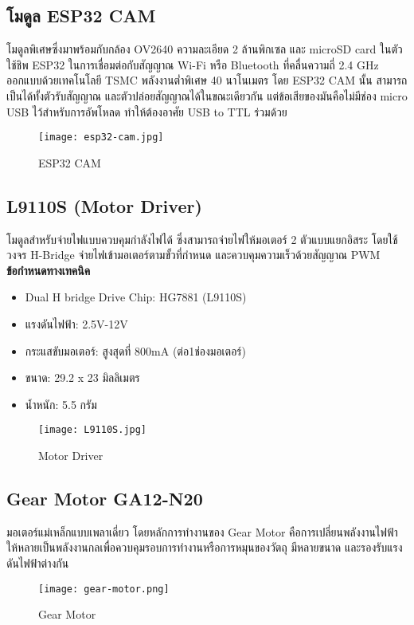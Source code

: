 \newpage\subsection{โมดูล ESP32 CAM}
โมดูลพิเศษซึ่งมาพร้อมกับกล้อง OV2640 ความละเอียด 2 ล้านพิกเซล และ microSD card ในตัว ใช้ชิพ ESP32 ในการเชื่อมต่อกับสัญญาณ Wi-Fi หรือ Bluetooth ที่คลื่นความถี่ 2.4 GHz
ออกแบบด้วยเทคโนโลยี TSMC พลังงานต่ำพิเศษ 40 นาโนเมตร โดย ESP32 CAM นั้น สามารถเป็นได้ทั้งตัวรับสัญญาณ และตัวปล่อยสัญญาณได้ในขณะเดียวกัน แต่ข้อเสียของมันคือไม่มีช่อง micro USB
ไว้สำหรับการอัพโหลด ทำให้ต้องอาศัย USB to TTL ร่วมด้วย \cite{ESP32CAM}
\begin{figure}[ht]
    \centering
    \texttt{[image: esp32-cam.jpg]}
    \caption{ESP32 CAM}
    \label{fig:esp32-cam}
\end{figure}

\subsection{L9110S (Motor Driver)}
โมดูลสำหรับจ่ายไฟแบบควบคุมกำลังไฟได้ ซึ่งสามารถจ่ายไฟให้มอเตอร์ 2 ตัวแบบแยกอิสระ โดยใช้วงจร H-Bridge จ่ายไฟเข้ามอเตอร์ตามขั้วที่กำหนด และควบคุมความเร็วด้วยสัญญาณ PWM
\\\textbf{ข้อกำหนดทางเทคนิค} \cite{MotorControlDriverChip}
\begin{itemize}
    \itemsep0em
    \item Dual H bridge Drive Chip: HG7881 (L9110S)
    \item แรงดันไฟฟ้า: 2.5V-12V
    \item กระแสขับมอเตอร์: สูงสุดที่ 800mA (ต่อ1ช่องมอเตอร์)
    \item ขนาด: 29.2 x 23 มิลลิเมตร
    \item น้ำหนัก: 5.5 กรัม
\end{itemize}
\begin{figure}[ht]
    \centering
    \texttt{[image: L9110S.jpg]}
    \caption{Motor Driver}
    \label{fig:L9110S}
\end{figure}

\subsection{Gear Motor GA12-N20}
มอเตอร์แม่เหล็กแบบเพลาเดี่ยว โดยหลักการทำงานของ Gear Motor คือการเปลี่ยนพลังงานไฟฟ้าให้หลายเป็นพลังงานกลเพื่อควบคุมรอบการทำงานหรือการหมุนของวัตถุ มีหลายขนาด และรองรับแรงดันไฟฟ้าต่างกัน
\begin{figure}[ht]
    \centering
    \texttt{[image: gear-motor.png]}
    \caption{Gear Motor}
    \label{fig:gear-motor}
\end{figure}

